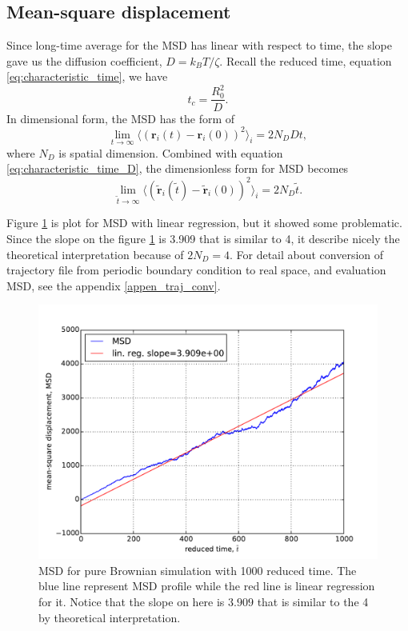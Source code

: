 \documentclass[10pt, a4paper]{report}
\begin{document}
\subsection{Mean-square displacement}
Since long-time average for the MSD has linear with respect to time, the slope gave us the diffusion coefficient, $D = k_BT/\zeta$. Recall the reduced time, equation \eqref{eq:characteristic_time}, we have
\begin{equation}
t_c = \frac{R_0^2}{D}.\label{eq:characteristic_time_D}
\end{equation}
In dimensional form, the MSD has the form of
\begin{equation}
\lim_{t\to\infty}\langle \left(\mathbf{r}_i(t)- \mathbf{r}_i(0)\right)^2\rangle_i = 2N_D Dt,
\end{equation}
where $N_D$ is spatial dimension.
Combined with equation \eqref{eq:characteristic_time_D}, the dimensionless form for MSD becomes
\begin{equation}
\lim_{\tilde{t}\to\infty}\langle \left(\tilde{\mathbf{r}}_i(\tilde{t})- \tilde{\mathbf{r}}_i(0)\right)^2\rangle_i = 2N_D\tilde{t}.
\end{equation}

Figure \ref{fig:MSD_brownian} is plot for MSD with linear regression, but it showed some problematic. Since the slope on the figure \ref{fig:MSD_brownian} is 3.909 that is similar to 4, it describe nicely the theoretical interpretation because of $2N_D = 4$.
For detail about conversion of trajectory file from periodic boundary condition to real space, and evaluation MSD, see the appendix \ref{appen_traj_conv}.

\begin{figure}
  \centering
  \includegraphics[width=\textwidth]{figures/MSD_2d_Brownian.pdf}
  \caption{MSD for pure Brownian simulation with 1000 reduced time. The blue line represent MSD profile while the red line is linear regression for it. Notice that the slope on here is $3.909$ that is similar to the 4 by theoretical interpretation.}
  \label{fig:MSD_brownian}
\end{figure}
\end{document}
